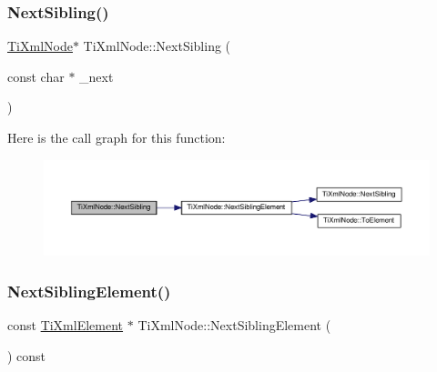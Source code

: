 \subsubsection{\texorpdfstring{Next\+Sibling()}{NextSibling()}\hspace{0.1cm}{\footnotesize\ttfamily [4/4]}}
{\footnotesize\ttfamily \hyperlink{class_ti_xml_node}{Ti\+Xml\+Node}$\ast$ Ti\+Xml\+Node\+::\+Next\+Sibling (\begin{DoxyParamCaption}\item[{const char $\ast$}]{\+\_\+next }\end{DoxyParamCaption})\hspace{0.3cm}{\ttfamily [inline]}}

Here is the call graph for this function\+:
\nopagebreak
\begin{figure}[H]
\begin{center}
\leavevmode
\includegraphics[width=350pt]{class_ti_xml_node_a4080bc5cc8a5c139e7cf308669e850fc_cgraph}
\end{center}
\end{figure}
\mbox{\label{class_ti_xml_node_ac6105781c913a42aa7f3f17bd1964f7c}} 
\subsubsection{\texorpdfstring{Next\+Sibling\+Element()}{NextSiblingElement()}\hspace{0.1cm}{\footnotesize\ttfamily [1/4]}}
{\footnotesize\ttfamily const \hyperlink{class_ti_xml_element}{Ti\+Xml\+Element} $\ast$ Ti\+Xml\+Node\+::\+Next\+Sibling\+Element (\begin{DoxyParamCaption}{ }\end{DoxyParamCaption}) const}

